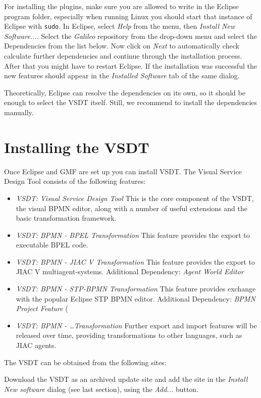 For installing the plugins, make sure you are allowed to write in the Eclipse program folder,
especially when running Linux you should start that instance of Eclipse with \texttt{sudo}. In
Eclipse, select \emph{Help} from the menu, then \emph{Install New Software...}. Select the
\emph{Galileo} repository from the drop-down menu and select the Dependencies from the list below.
Now click on \emph{Next} to automatically check calculate further dependencies and continue through
the installation process. After that you might have to restart Eclipse. If the installation was
successful the new features should appear in the \emph{Installed Software} tab of the same dialog.

Theoretically, Eclipse can resolve the dependencies on its own, so it should be enough to select the
VSDT itself. Still, we recommend to install the dependencies manually.


\section{Installing the VSDT}
\label{sec:user_setup_vsdt}

Once Eclipse and GMF are set up you can install VSDT. The Visual Service Design Tool consists of the
following features:

\begin{itemize}
	\item \emph{VSDT: Visual Service Design Tool} This is the core component of the VSDT, the visual
	BPMN editor, along with a number of useful extensions and the basic transformation framework.
	\item \emph{VSDT: BPMN - BPEL Transformation} This feature provides the export to executable
	BPEL code.
	\item \emph{VSDT: BPMN - JIAC V Transformation} This feature provides the export to JIAC V
	multiagent-systems. Additional Dependency: \emph{Agent World Editor}
	\item \emph{VSDT: BPMN - STP-BPMN Transformation} This feature provides exchange with the
	popular Eclipse STP BPMN editor. Additional Dependency: \emph{BPMN Project Feature} (
	\item \emph{VSDT: BPMN - \dots Transformation} Further export and import features will be
	released over time, providing transformations to other languages, such as JIAC agents.
\end{itemize}

The VSDT can be obtained from the following sites:
\begin{center}
	\downloadsites
\end{center}

Download the VSDT as an archived update site and add the site in the \emph{Install New software}
dialog (see last section), using the \emph{Add...} button.

